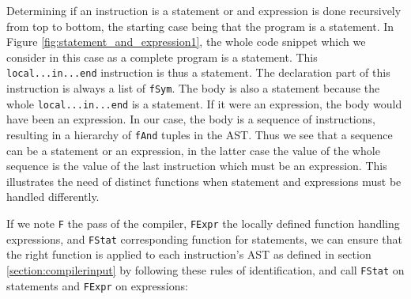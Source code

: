 \documentclass[a4paper]{memoir}
\begin{document}
Determining if an instruction is a statement or and expression is done
recursively from top to bottom, the starting case being that the program is a
statement. In Figure \ref{fig:statement_and_expression1}, the
whole code snippet which we consider in this case as a complete program is a
statement. This \lstinline!local...in...end! instruction is thus a statement.
The declaration part of this instruction is always a list of \lstinline!fSym!. The body is
also a statement because the whole \lstinline!local...in...end! is a statement. If it were
an expression, the body
would have been an expression. In our case, the body is a sequence of
instructions, resulting in a hierarchy of \lstinline!fAnd! tuples in the AST. Thus we see that a sequence
can be a statement or an expression, in the latter case the value
of the whole sequence is the value of the last instruction which must be an expression. This illustrates the
need of distinct functions when statement and expressions must be handled
differently. 

If we note \lstinline!F! the pass of the compiler, \lstinline!FExpr! the locally defined
function handling expressions, and \lstinline!FStat! corresponding function for
statements, we can ensure that the right function is applied to each
instruction's AST as defined in section \ref{section:compilerinput} by following
these rules of identification, and call \lstinline!FStat! on statements and
\lstinline!FExpr! on expressions:
\end{document}
